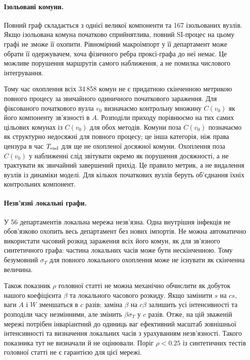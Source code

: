\documentclass[11pt,a4paper]{article}
\begin{document}
\paragraph{Ізольовані комуни.}
Повний граф складається з однієї великої компоненти та 167 ізольованих вузлів. Якщо ізольована комуна початково сприйнятлива, повний SI-процес на цьому графі не зможе її охопити. Рівномірний макроімпорт у її департамент може обрати її одержувачем, хоча фізичного ребра проксі-графа до неї немає. Це можливе порушення маршрутів самого наближення, а не помилка числового інтегрування.

Тому час охоплення всіх 34\,858 комун не є придатною скінченною метрикою повного процесу за звичайного одиничного початкового зараження. Для фіксованого початкового вузла $v_0$ визначаємо контрольну множину $C(v_0)$ як його компоненту зв'язності в $A$. Розподіли приходу порівнюємо на тих самих цільових комунах із $C(v_0)$ для обох методів. Комуни поза $C(v_0)$ позначаємо як структурно недосяжні для повного процесу; це інша категорія, ніж права цензура в час $T_{\rm end}$ для ще не охопленої досяжної комуни. Охоплення поза $C(v_0)$ у наближенні слід звітувати окремо як порушення досяжності, а не трактувати як звичайний завершений прихід. Це правило метрик, а не видалення вузлів із динаміки моделі. Для кількох початкових вузлів беруть об'єднання їхніх контрольних компонент.

\paragraph{Незв'язні локальні графи.}
У 56 департаментів локальна мережа незв'язна. Одна внутрішня інфекція не обов'язково охопить весь департамент без нових імпортів. Не можна автоматично використати часовий розкид зараження всіх його комун, як для зв'язного синтетичного графа: частина локальних часів може бути нескінченною. Тому безумовний $\sigma_T$ для повного локального охоплення може не існувати як скінченна величина.

Також показник $\rho$ головної статті не можна механічно обчислити як добуток нашого коефіцієнта $\beta$ та локального часового розкиду. Якщо замінити $s$ на $cs$, ваги $A$ і $W$ зменшаться в $c$ разів; заміна $\beta$ на $c\beta$ залишить усі інтенсивності та розподіли часу незмінними, але змінить $\beta\sigma_T$ у $c$ разів. Отже, на цій зваженій мережі потрібен інваріантний до одиниць ваг ефективний масштаб зовнішньої інтенсивності та визначення локальних часів з урахуванням незв'язності. Такого показника тут не визначали й не оцінювали. Поріг $\rho<0.25$ із синтетичних тестів головної статті не є гарантією для цієї мережі.
\end{document}
